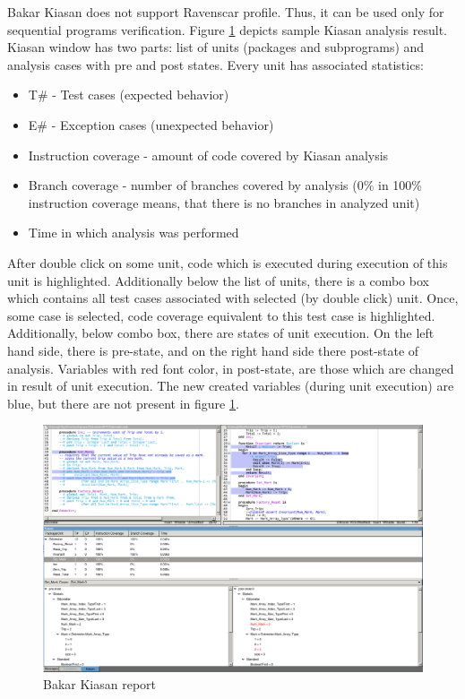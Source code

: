 Bakar Kiasan does not support Ravenscar profile. Thus, it can be used only for sequential programs verification. Figure \ref{figure:kiasan-sample} depicts sample Kiasan analysis result. Kiasan window has two parts: list of units (packages and subprograms) and analysis cases with pre and post states. Every unit has associated statistics:
\begin{itemize}
	\item T\# - Test cases (expected behavior)
	\item E\# - Exception cases (unexpected behavior)
	\item Instruction coverage - amount of code covered by Kiasan analysis
	\item Branch coverage - number of branches covered by analysis (0\% in 100\% instruction coverage means, that there is no branches in analyzed unit)
	\item Time in which analysis was performed
\end{itemize}

After double click on some unit, code which is executed during execution of this unit is highlighted. Additionally below the list of units, there is a combo box which contains all test cases associated with selected (by double click) unit. Once, some case is selected, code coverage equivalent to this test case is highlighted. Additionally, below combo box, there are states of unit execution. On the left hand side, there is pre-state, and on the right hand side there post-state of analysis. Variables with red font color, in post-state, are those which are changed in result of unit execution. The new created variables (during unit execution) are blue, but there are not present in figure \ref{figure:kiasan-sample}.

\begin{figure}[ht]%
    \begin{center}
    	\includegraphics[width=1\textwidth]{figures/kiasan-sample.png}    	
    \end{center}
    \caption{Bakar Kiasan report}
    \label{figure:kiasan-sample}
\end{figure}

